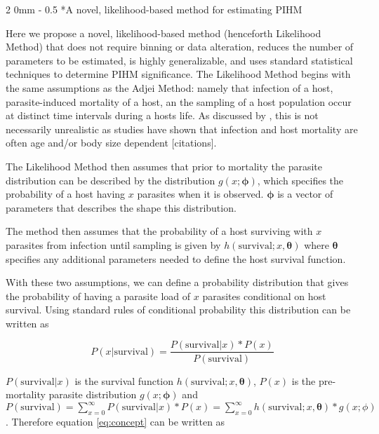 \documentclass[12pt, a4paper]{article}
\makeatletter
\renewcommand{\subsection}{\@startsection
{subsection}%
{2}%
{0mm}%
{-\baselineskip}%
{0.5\baselineskip}%
{\normalfont\bf}} %
\makeatother
\begin{document}
\subsection*{A novel, likelihood-based method for estimating PIHM}

Here we propose a novel, likelihood-based method (henceforth Likelihood Method)
that does not require binning or data alteration, reduces the number of
parameters to be estimated, is highly generalizable, and uses standard
statistical techniques to determine PIHM significance.  The Likelihood Method
begins with the same assumptions as the Adjei Method: namely that infection of
a host, parasite-induced mortality of a host, an the sampling of a host
population occur at distinct time intervals during a hosts life. As discussed by
\citeauthor{Adjei1986}, this is not necessarily unrealistic as studies have
shown that infection and host mortality are often age and/or body size dependent [citations].

The Likelihood Method then assumes that prior to mortality the parasite distribution can be described by the distribution $g(x; \boldsymbol{\phi})$, which specifies the probability of a host having $x$ parasites when it is observed.  $\boldsymbol{\phi}$ is a vector of parameters that describes the shape this distribution.

The method then assumes that the probability of a host surviving with $x$ parasites from infection until sampling is given by $h(\text{survival} ; x, \boldsymbol{\theta})$ where $\boldsymbol{\theta}$ specifies any additional parameters needed to define the host survival function.

With these two assumptions, we can define a probability distribution that gives the probability of having a parasite load of $x$ parasites conditional on host survival.  Using standard rules of conditional probability this distribution can be written as

\begin{equation}
    P(x | \text{survival}) = \dfrac{P(\text{survival} | x) * P(x)}{P(\text{survival})}
    \label{eq:concept}
\end{equation}

$P(\text{survival} | x)$ is the survival function $h(\text{survival}; x, \boldsymbol{\theta})$, $P(x)$ is the pre-mortality parasite distribution $g(x; \boldsymbol{\phi})$ and $P(\text{survival}) = \sum_{x=0}^{\infty} P(\text{survival} | x) * P(x) =  \sum_{x=0}^{\infty} h(\text{survival}; x, \boldsymbol{\theta})  * g(x; \phi)$. Therefore equation \ref{eq:concept} can be written as
\end{document}
